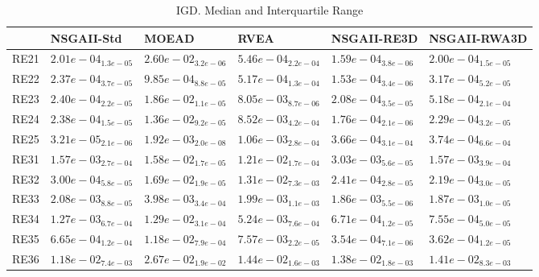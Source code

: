 \documentclass{article}
\begin{document}
\begin{table}
\caption{IGD. Median and Interquartile Range}
\label{table: IGD}
\centering
\begin{scriptsize}
\begin{tabular}{llllll}
\hline & NSGAII-Std & MOEAD & RVEA & NSGAII-RE3D &  NSGAII-RWA3D\\
\hline 
RE21 & $  2.01e-04_{ 1.3e-05}$ & $  2.60e-02_{ 3.2e-06}$ & $  5.46e-04_{ 2.2e-04}$ & \cellcolor{gray95}$  1.59e-04_{ 3.8e-06}$ & \cellcolor{gray25}$  2.00e-04_{ 1.5e-05}$ \\
RE22 & \cellcolor{gray25}$  2.37e-04_{ 3.7e-05}$ & $  9.85e-04_{ 8.8e-05}$ & $  5.17e-04_{ 1.3e-04}$ & \cellcolor{gray95}$  1.53e-04_{ 3.4e-06}$ & $  3.17e-04_{ 5.2e-05}$ \\
RE23 & \cellcolor{gray25}$  2.40e-04_{ 2.2e-05}$ & $  1.86e-02_{ 1.1e-05}$ & $  8.05e-03_{ 8.7e-06}$ & \cellcolor{gray95}$  2.08e-04_{ 3.5e-05}$ & $  5.18e-04_{ 2.1e-04}$ \\
RE24 & $  2.38e-04_{ 1.5e-05}$ & $  1.36e-02_{ 9.2e-05}$ & $  8.52e-03_{ 4.2e-04}$ & \cellcolor{gray95}$  1.76e-04_{ 2.1e-06}$ & \cellcolor{gray25}$  2.29e-04_{ 3.2e-05}$ \\
RE25 & \cellcolor{gray95}$  3.21e-05_{ 2.1e-06}$ & $  1.92e-03_{ 2.0e-08}$ & $  1.06e-03_{ 2.8e-04}$ & \cellcolor{gray25}$  3.66e-04_{ 3.1e-04}$ & $  3.74e-04_{ 6.6e-04}$ \\
RE31 & \cellcolor{gray95}$  1.57e-03_{ 2.7e-04}$ & $  1.58e-02_{ 1.7e-05}$ & $  1.21e-02_{ 1.7e-04}$ & $  3.03e-03_{ 5.6e-05}$ & \cellcolor{gray25}$  1.57e-03_{ 3.9e-04}$ \\
RE32 & $  3.00e-04_{ 5.8e-05}$ & $  1.69e-02_{ 1.9e-05}$ & $  1.31e-02_{ 7.3e-03}$ & \cellcolor{gray25}$  2.41e-04_{ 2.8e-05}$ & \cellcolor{gray95}$  2.19e-04_{ 3.0e-05}$ \\
RE33 & $  2.08e-03_{ 8.8e-05}$ & $  3.98e-03_{ 3.4e-04}$ & $  1.99e-03_{ 1.1e-03}$ & \cellcolor{gray95}$  1.86e-03_{ 5.5e-06}$ & \cellcolor{gray25}$  1.87e-03_{ 1.0e-05}$ \\
RE34 & $  1.27e-03_{ 6.7e-04}$ & $  1.29e-02_{ 3.1e-04}$ & $  5.24e-03_{ 7.6e-04}$ & \cellcolor{gray95}$  6.71e-04_{ 1.2e-05}$ & \cellcolor{gray25}$  7.55e-04_{ 5.0e-05}$ \\
RE35 & $  6.65e-04_{ 1.2e-04}$ & $  1.18e-02_{ 7.9e-04}$ & $  7.57e-03_{ 2.2e-05}$ & \cellcolor{gray95}$  3.54e-04_{ 7.1e-06}$ & \cellcolor{gray25}$  3.62e-04_{ 1.2e-05}$ \\
RE36 & \cellcolor{gray95}$  1.18e-02_{ 7.4e-03}$ & $  2.67e-02_{ 1.9e-02}$ & $  1.44e-02_{ 1.6e-03}$ & \cellcolor{gray25}$  1.38e-02_{ 1.8e-03}$ & $  1.41e-02_{ 8.3e-03}$ \\

\end{tabular}
\end{scriptsize}
\end{table}
\end{document}
